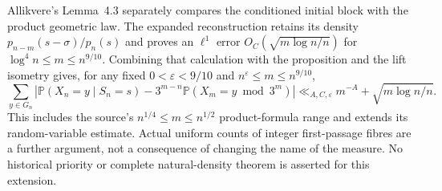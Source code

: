 Allikvere's Lemma~4.3 separately compares the conditioned initial block
with the product geometric law. The expanded reconstruction retains its
density $p_{n-m}(s-\sigma)/p_n(s)$ and proves an $\ell^1$ error
$O_C(\sqrt{m\log n/n})$ for $\log^4n\le m\le n^{9/10}$.
Combining that calculation with the proposition and the lift isometry
gives, for any fixed $0<\varepsilon<9/10$ and $n^\varepsilon\le m\le n^{9/10}$,
\[
 \sum_{y\in G_n}\left|\mathbb P(X_n=y\mid S_n=s)
    -3^{m-n}\mathbb P(X_m=y\bmod3^m)\right|
 \ll_{A,C,\varepsilon}m^{-A}+\sqrt{m\log n/n}.
\]
This includes the source's $n^{1/4}\le m\le n^{1/2}$ product-formula
range and extends its random-variable estimate. Actual uniform counts of
integer first-passage fibres are a further argument, not a consequence
of changing the name of the measure. No historical priority or complete
natural-density theorem is asserted for this extension.
